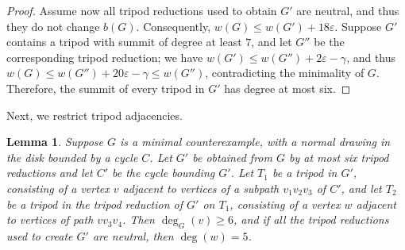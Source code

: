 \documentclass[12pt,twoside,openright,a4paper]{book}
\newtheorem{lemma}[theorem]{Lemma}
\begin{document}
\begin{proof}
Assume now all tripod reductions used to obtain $G'$ are neutral, and thus they do not change $b(G)$.
Consequently, $w(G)\le w(G')+18\varepsilon$.  Suppose $G'$ contains a tripod with summit of degree at least $7$,
and let $G''$ be the corresponding tripod reduction; we have $w(G')\le w(G'')+2\varepsilon-\gamma$,
and thus $w(G)\le w(G'')+20\varepsilon-\gamma\le w(G'')$, contradicting the minimality of $G$.
Therefore, the summit of every tripod in $G'$ has degree at most six.
\end{proof}

Next, we restrict tripod adjacencies.

\begin{lemma}\label{lemma:l5-tripadj}
Suppose $G$ is a minimal counterexample, with a normal drawing in the disk bounded by a cycle $C$.
Let $G'$ be obtained from $G$ by at most six tripod reductions and let $C'$ be the cycle bounding $G'$.
Let $T_1$ be a tripod in $G'$, consisting of a vertex $v$ adjacent to vertices of a subpath $v_1v_2v_3$ of $C'$,
and let $T_2$ be a tripod in the tripod reduction of $G'$ on $T_1$, consisting of a vertex $w$
adjacent to vertices of path $vv_3v_4$.  Then $\deg_G(v)\ge 6$, and if all the tripod reductions
used to create $G'$ are neutral, then $\deg(w)=5$.
\end{lemma}
\end{document}
